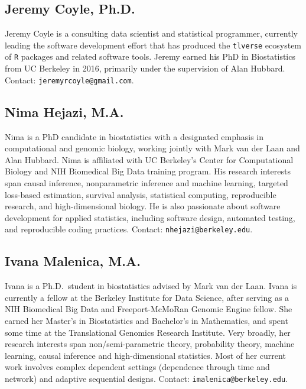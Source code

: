\documentclass[a4paper,11pt]{texMemo}
\begin{document}
\subsection*{Jeremy Coyle, Ph.D.}

\vspace{-.5em}

Jeremy Coyle is a consulting data scientist and statistical programmer,
currently leading the software development effort that has produced the
\texttt{tlverse} ecosystem of \texttt{R} packages and related software tools.
Jeremy earned his PhD in Biostatistics from UC Berkeley in 2016, primarily under
the supervision of Alan Hubbard. Contact: \texttt{jeremyrcoyle@gmail.com}.

\vspace{-.5em}

\subsection*{Nima Hejazi, M.A.}

\vspace{-.5em}

Nima is a PhD candidate in biostatistics with a designated emphasis in
computational and genomic biology, working jointly with Mark van der Laan and
Alan Hubbard. Nima is affiliated with UC Berkeley's Center for Computational
Biology and NIH Biomedical Big Data training program. His research interests
span causal inference, nonparametric inference and machine learning, targeted
loss-based estimation, survival analysis, statistical computing, reproducible
research, and high-dimensional biology. He is also passionate about software
development for applied statistics, including software design, automated
testing, and reproducible coding practices. Contact:
\texttt{nhejazi@berkeley.edu}.

\vspace{-.5em}

\subsection*{Ivana Malenica, M.A.}

\vspace{-.5em}

Ivana is a Ph.D.~student in biostatistics advised by Mark van der Laan. Ivana is
currently a fellow at the Berkeley Institute for Data Science, after serving as
a NIH Biomedical Big Data and Freeport-McMoRan Genomic Engine fellow. She earned
her Master's in Biostatistics and Bachelor's in Mathematics, and spent some time
at the Translational Genomics Research Institute. Very broadly, her research
interests span non/semi-parametric theory, probability theory, machine learning,
causal inference and high-dimensional statistics. Most of her current work
involves complex dependent settings (dependence through time and network) and
adaptive sequential designs. Contact: \texttt{imalenica@berkeley.edu}.
\end{document}
